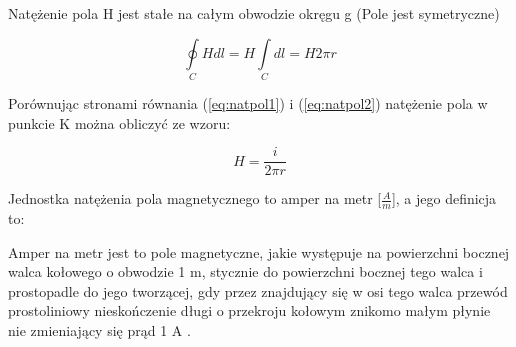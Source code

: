 Natężenie pola H jest stałe na całym obwodzie okręgu g (Pole jest symetryczne)

\begin{equation} \label{eq:natpol2}
	\oint\limits_C H dl = H \int\limits_C dl = H 2 \pi r
\end{equation}

Porównując stronami równania (\ref{eq:natpol1}) i (\ref{eq:natpol2}) natężenie pola w punkcie K można obliczyć ze wzoru:

\begin{equation} \label{eq:natpol3}
	H = \frac{i}{2 \pi r}
\end{equation}

Jednostka natężenia pola magnetycznego to amper na metr [$ \frac{A}{m} $], a jego definicja to:
	   
\begin{defn}
	Amper na metr jest to pole magnetyczne, jakie występuje na powierzchni bocznej walca kołowego o obwodzie 1 m, stycznie do powierzchni bocznej tego walca i prostopadle do jego tworzącej, gdy przez znajdujący się w osi tego walca przewód prostoliniowy nieskończenie długi o przekroju kołowym znikomo małym płynie nie zmieniający się prąd 1 A \cite{kaluszko}.
\end{defn}






